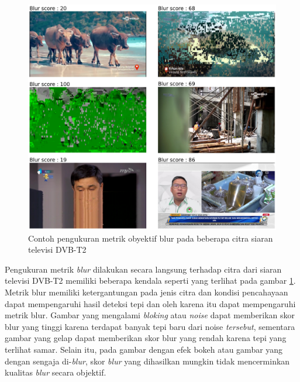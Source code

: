 \begin{figure}[H]
	\vspace{-0.1cm}
	\begin{center}
		\includegraphics[width=1\columnwidth]{bab4/Gambar/sample-blur.png}
	\end{center}
	\vspace{-0.2cm}
	\caption{Contoh pengukuran metrik obyektif  blur pada beberapa citra siaran televisi DVB-T2}
	\label{sample-blur}
\end{figure}

Pengukuran metrik  \textit{blur}  dilakukan secara langsung terhadap citra dari siaran televisi DVB-T2 memiliki beberapa kendala seperti yang terlihat pada gambar \ref{sample-blur}. Metrik blur memiliki ketergantungan pada jenis citra dan kondisi pencahayaan dapat mempengaruhi hasil deteksi tepi dan oleh karena itu dapat mempengaruhi metrik blur. Gambar yang mengalami \textit{bloking} atau \textit{noise} dapat memberikan skor blur yang tinggi karena terdapat banyak tepi baru dari noise \textit{tersebut}, sementara gambar yang gelap dapat memberikan skor blur yang rendah karena tepi yang terlihat samar. Selain itu, pada gambar dengan efek bokeh atau gambar yang dengan sengaja di-\textit{blur}, skor \textit{blur} yang dihasilkan mungkin tidak mencerminkan kualitas \textit{blur} secara objektif.

